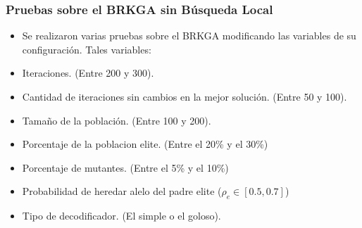 \documentclass{beamer}
\begin{document}
\begin{frame}
\frametitle{Pruebas sobre el BRKGA sin Búsqueda Local}

\begin{itemize}
    \item Se realizaron varias pruebas sobre el BRKGA modificando las variables de su configuración. Tales variables:
    \pause
    \item Iteraciones. (Entre 200 y 300).
    \pause
    \item Cantidad de iteraciones sin cambios en la mejor solución. (Entre 50 y 100).
    \pause
    \item Tamaño de la población. (Entre 100 y 200).
    \pause
    \item Porcentaje de la poblacion elite. (Entre el 20\% y el 30\%)
    \pause
    \item Porcentaje de mutantes. (Entre el 5\% y el 10\%)
    \pause
    \item Probabilidad de heredar alelo del padre elite ($\rho_e \in [0.5,0.7]$)
    \pause
    \item Tipo de decodificador. (El simple o el goloso).
\end{itemize}

\end{frame}

\end{document}
